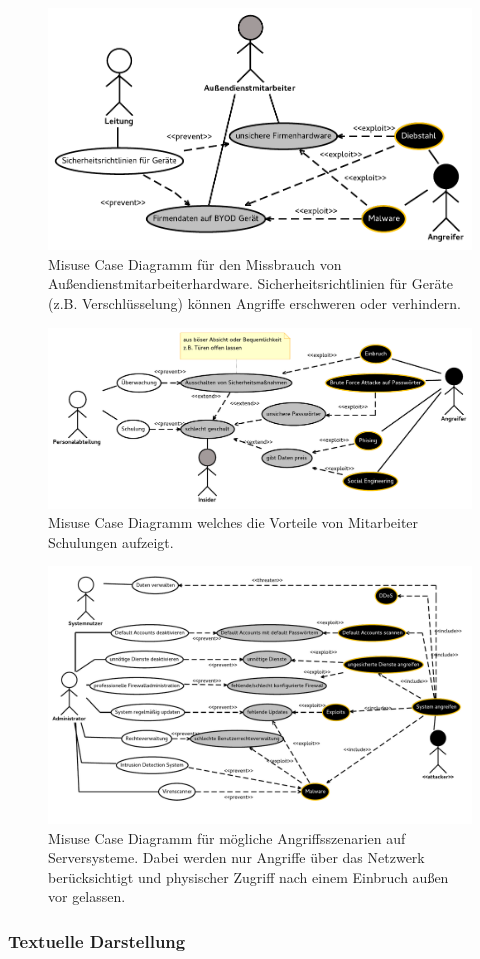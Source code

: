 \begin{figure}
\includegraphics[scale=0.8]{images/Hardware.pdf} 
\caption{Misuse Case Diagramm für den Missbrauch von Außendienstmitarbeiterhardware. Sicherheitsrichtlinien für Geräte (z.B. Verschlüsselung) können Angriffe erschweren oder verhindern.}
\end{figure}


\begin{figure}
\includegraphics[scale=0.8,angle=90]{images/Schulung.pdf} 
\caption{Misuse Case Diagramm welches die Vorteile von Mitarbeiter Schulungen aufzeigt.}
\end{figure}

\begin{figure}
\includegraphics[scale=0.8,angle=90]{images/Server.pdf} 
\caption{Misuse Case Diagramm für mögliche Angriffsszenarien auf Serversysteme. Dabei werden nur Angriffe über das Netzwerk berücksichtigt und physischer Zugriff nach einem Einbruch außen vor gelassen.}
\end{figure}


\subsubsection{Textuelle Darstellung}